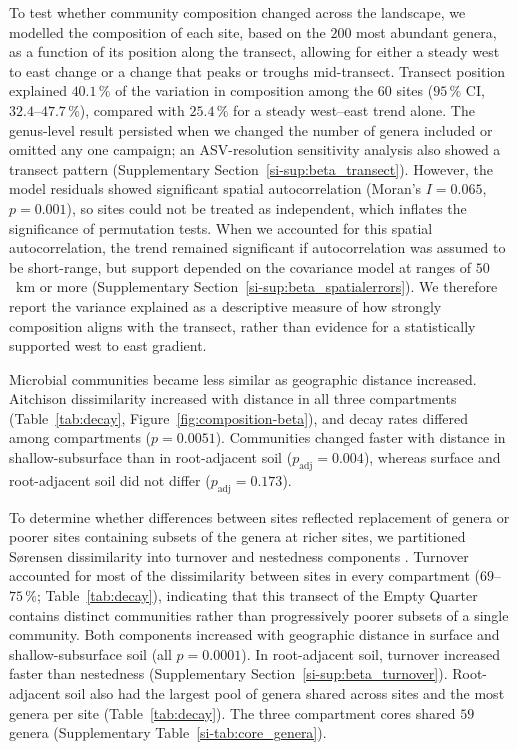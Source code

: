\documentclass[fleqn,10pt,numbers]{olplainarticle}
\begin{document}
To test whether community composition changed across the landscape, we modelled the composition of each site, based on the $200$ most abundant genera, as a function of its position along the transect, allowing for either a steady west to east change or a change that peaks or troughs mid-transect. Transect position explained $40.1\,\%$ of the variation in composition among the $60$ sites ($95\,\%$ CI, $32.4$--$47.7\,\%$), compared with $25.4\,\%$ for a steady west--east trend alone. The genus-level result persisted when we changed the number of genera included or omitted any one campaign; an ASV-resolution sensitivity analysis also showed a transect pattern (Supplementary Section~\ref{si-sup:beta_transect}). However, the model residuals showed significant spatial autocorrelation (Moran's $I=0.065$, $p=0.001$), so sites could not be treated as independent, which inflates the significance of permutation tests. When we accounted for this spatial autocorrelation, the trend remained significant if autocorrelation was assumed to be short-range, but support depended on the covariance model at ranges of $50$~km or more (Supplementary Section~\ref{si-sup:beta_spatialerrors}). We therefore report the variance explained as a descriptive measure of how strongly composition aligns with the transect, rather than evidence for a statistically supported west to east gradient.


Microbial communities became less similar as geographic distance increased. Aitchison dissimilarity increased with distance in all three compartments (Table~\ref{tab:decay}, Figure~\ref{fig:composition-beta}), and decay rates differed among compartments ($p=0.0051$). Communities changed faster with distance in shallow-subsurface than in root-adjacent soil ($p_{\mathrm{adj}}=0.004$), whereas surface and root-adjacent soil did not differ ($p_{\mathrm{adj}}=0.173$).

To determine whether differences between sites reflected replacement of genera or poorer sites containing subsets of the genera at richer sites, we partitioned S\o{}rensen dissimilarity into turnover and nestedness components \cite{baselga2010partition}. Turnover accounted for most of the dissimilarity between sites in every compartment ($69$--$75\,\%$; Table~\ref{tab:decay}), indicating that this transect of the Empty Quarter contains distinct communities rather than progressively poorer subsets of a single community. Both components increased with geographic distance in surface and shallow-subsurface soil (all $p=0.0001$). In root-adjacent soil, turnover increased faster than nestedness (Supplementary Section~\ref{si-sup:beta_turnover}). Root-adjacent soil also had the largest pool of genera shared across sites and the most genera per site
(Table~\ref{tab:decay}). The three compartment cores shared $59$ genera (Supplementary Table~\ref{si-tab:core_genera}).
\end{document}
